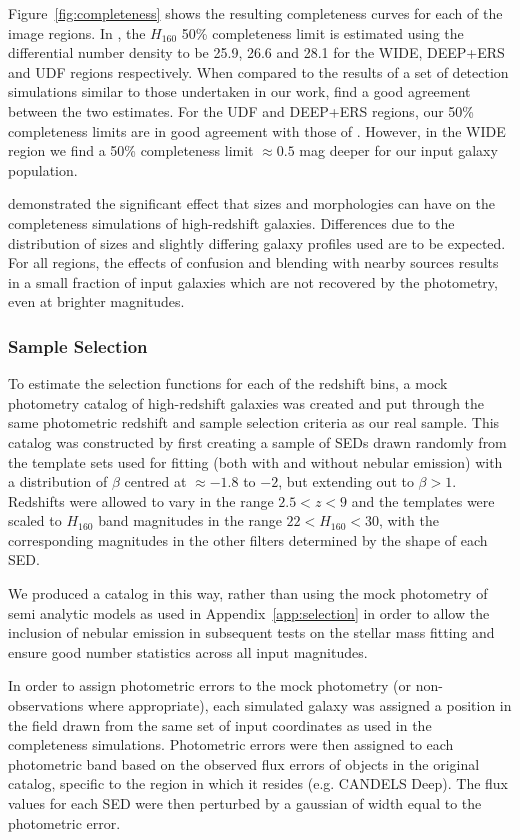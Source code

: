 Figure~\ref{fig:completeness} shows the resulting completeness curves for each of the image regions. In \citet{Guo:2013ig}, the $H_{160}$ 50\% completeness limit is estimated using the differential number density to be 25.9, 26.6 and 28.1 for the WIDE, DEEP+ERS and UDF regions respectively. When compared to the results of a set of detection simulations similar to those undertaken in our work, \citet{Guo:2013ig} find a good agreement between the two estimates. For the UDF and DEEP+ERS regions, our 50\% completeness limits are in good agreement with those of \citet{Guo:2013ig}. However, in the WIDE region we find a 50\% completeness limit $\approx 0.5$ mag deeper for our input galaxy population.

\citet{2011A&A...532A..33G} demonstrated the significant effect that sizes and morphologies can have on the completeness simulations of high-redshift galaxies. Differences due to the distribution of sizes and slightly differing galaxy profiles used are to be expected. For all regions, the effects of confusion and blending with nearby sources results in a small fraction of input galaxies which are not recovered by the photometry, even at brighter magnitudes.

\subsubsection{Sample Selection}\label{sec:selection_sims}
To estimate the selection functions for each of the redshift bins, a mock photometry catalog of high-redshift galaxies was created and put through the same photometric redshift and sample selection criteria as our real sample. This catalog was constructed by first creating a sample of SEDs drawn randomly from the template sets used for fitting (both with and without nebular emission) with a distribution of $\beta$ centred at $\approx -1.8$ to $-2$, but extending out to $\beta > 1$. Redshifts were allowed to vary in the range $2.5 < z < 9$ and the templates were scaled to $H_{160}$ band magnitudes in the range $22 < H_{160} < 30$, with the corresponding magnitudes in the other filters determined by the shape of each SED.

We produced a catalog in this way, rather than using the mock photometry of semi analytic models as used in Appendix~\ref{app:selection} in order to allow the inclusion of nebular emission in subsequent tests on the stellar mass fitting and ensure good number statistics across all input magnitudes. 

In order to assign photometric errors to the mock photometry (or non-observations where appropriate), each simulated galaxy was assigned a position in the field drawn from the same set of input coordinates as used in the completeness simulations. Photometric errors were then assigned to each photometric band based on the observed flux errors of objects in the original catalog, specific to the region in which it resides (e.g. CANDELS Deep). The flux values for each SED were then perturbed by a gaussian of width equal to the photometric error.

